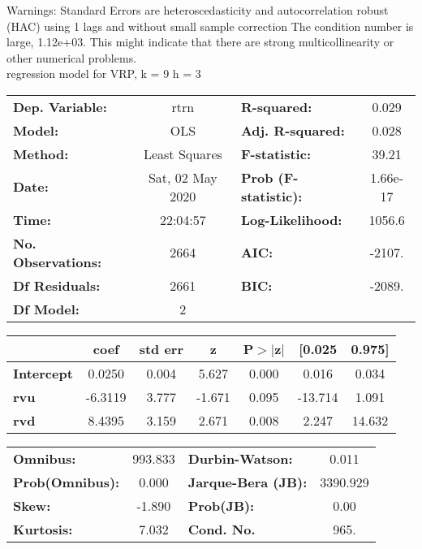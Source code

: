 Warnings: \newline
 [1] Standard Errors are heteroscedasticity and autocorrelation robust (HAC) using 1 lags and without small sample correction \newline
 [2] The condition number is large, 1.12e+03. This might indicate that there are \newline
 strong multicollinearity or other numerical problems.\\ 

regression model for VRP, k = 9 h = 3\begin{center}
\begin{tabular}{lclc}
\toprule
\textbf{Dep. Variable:}    &       rtrn       & \textbf{  R-squared:         } &     0.029   \\
\textbf{Model:}            &       OLS        & \textbf{  Adj. R-squared:    } &     0.028   \\
\textbf{Method:}           &  Least Squares   & \textbf{  F-statistic:       } &     39.21   \\
\textbf{Date:}             & Sat, 02 May 2020 & \textbf{  Prob (F-statistic):} &  1.66e-17   \\
\textbf{Time:}             &     22:04:57     & \textbf{  Log-Likelihood:    } &    1056.6   \\
\textbf{No. Observations:} &        2664      & \textbf{  AIC:               } &    -2107.   \\
\textbf{Df Residuals:}     &        2661      & \textbf{  BIC:               } &    -2089.   \\
\textbf{Df Model:}         &           2      & \textbf{                     } &             \\
\bottomrule
\end{tabular}
\begin{tabular}{lcccccc}
                   & \textbf{coef} & \textbf{std err} & \textbf{z} & \textbf{P$> |$z$|$} & \textbf{[0.025} & \textbf{0.975]}  \\
\midrule
\textbf{Intercept} &       0.0250  &        0.004     &     5.627  &         0.000        &        0.016    &        0.034     \\
\textbf{rvu}       &      -6.3119  &        3.777     &    -1.671  &         0.095        &      -13.714    &        1.091     \\
\textbf{rvd}       &       8.4395  &        3.159     &     2.671  &         0.008        &        2.247    &       14.632     \\
\bottomrule
\end{tabular}
\begin{tabular}{lclc}
\textbf{Omnibus:}       & 993.833 & \textbf{  Durbin-Watson:     } &    0.011  \\
\textbf{Prob(Omnibus):} &   0.000 & \textbf{  Jarque-Bera (JB):  } & 3390.929  \\
\textbf{Skew:}          &  -1.890 & \textbf{  Prob(JB):          } &     0.00  \\
\textbf{Kurtosis:}      &   7.032 & \textbf{  Cond. No.          } &     965.  \\
\bottomrule
\end{tabular}
\end{center}


